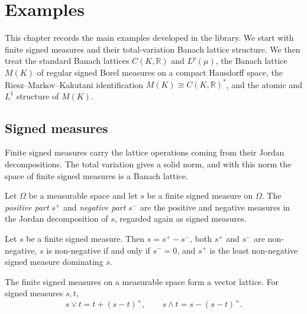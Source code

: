 \chapter{Examples}

This chapter records the main examples developed in the library.
We start with finite signed measures and their total-variation
Banach lattice structure. We then treat the standard Banach
lattices $C(K,\mathbb{R})$ and $L^p(\mu)$, the Banach lattice
$M(K)$ of regular signed Borel measures on a compact Hausdorff
space, the Riesz--Markov--Kakutani identification
$M(K) \cong C(K,\mathbb{R})^{*}$, and the atomic and $L^1$
structure of $M(K)$.

\section{Signed measures}

Finite signed measures carry the lattice operations coming from
their Jordan decompositions. The total variation gives a solid norm,
and with this norm the space of finite signed measures is a Banach
lattice.

\begin{definition}
\label{def:signedMeasure-pos-neg}
\leanok
Let $\Omega$ be a measurable space and let $s$ be a finite signed
measure on $\Omega$. The \emph{positive part} $s^{+}$ and
\emph{negative part} $s^{-}$ are the positive and negative measures
in the Jordan decomposition of $s$, regarded again as signed
measures.
\end{definition}

\begin{lemma}
\label{lem:signedMeasure-jordan-parts}
\leanok
{}
Let $s$ be a finite signed measure. Then
$s = s^{+} - s^{-}$, both $s^{+}$ and $s^{-}$ are non-negative,
$s$ is non-negative if and only if $s^{-}=0$, and $s^{+}$ is the
least non-negative signed measure dominating $s$.
\end{lemma}

\begin{theorem}
\label{thm:signedMeasure-vectorLattice}
\leanok
{}
The finite signed measures on a measurable space form a vector
lattice. For signed measures $s,t$,
\[
  s \vee t = t + (s-t)^{+}, \qquad
  s \wedge t = s - (s-t)^{+}.
\]
\end{theorem}

